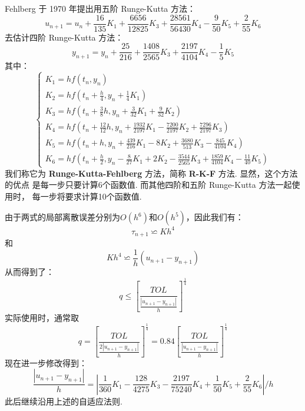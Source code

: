 \documentclass[UTF8,ctexart,a4paper,11pt,openany]{article}
\theoremstyle{definition}
\begin{document}
    Fehlberg 于 1970 年提出用五阶 Runge-Kutta 方法：$$u_{n+1}=u_n+\frac{16}{135}K_1+\frac{6656}{12825}K_3+\frac{28561}{56430}K_4-\frac{9}{50}K_5+\frac{2}{55}K_6$$去估计四阶 Runge-Kutta 方法：$$y_{n+1}=y_n+\frac{25}{216}+\frac{1408}{2565}K_3+\frac{2197}{4104}K_4-\frac{1}{5}K_5$$其中：$$    \left\{\begin{array}{l}
        K_{1}=hf\left(t_{n}, y_{n}\right) \\ 
        K_{2}=hf\left(t_{n}+\frac{h}{4}, y_{n}+\frac{1}{4}K_1\right) \\ 
        K_{3}=hf\left(t_{n}+\frac{3}{8}h, y_{n}+\frac{3}{32}K_1+\frac{9}{32}K_2\right) \\ 
        K_{4}=hf\left(t_{n}+\frac{12}{12}h, y_{n}+\frac{1932}{2197}K_1-\frac{7200}{2197}K_2+\frac{7296}{2197}K_3\right) \\ 
        K_{5}=hf\left(t_{n}+h, y_{n}+\frac{439}{216}K_1-8K_2+\frac{3680}{513}K_3-\frac{845}{4104}K_4\right) \\ 
        K_{6}=hf\left(t_{n}+\frac{h}{2}, y_{n}-\frac{8}{27}K_1+2K_2-\frac{3544}{2565}K_3+\frac{1859}{4104}K_4-\frac{11}{40}K_5\right)  
    \end{array}
    \right.$$我们称它为 \textbf{Runge-Kutta-Fehlberg} 方法，简称 \textbf{R-K-F} 方法. 显然，这个方法的优点
    是每一步只要计算6个函数值. 而其他四阶和五阶 Runge-Kutta 方法一起使用时， 
    每一步将要求计算10个函数值. \par
    由于两式的局部离散误差分别为$O(h^6)$和$O(h^5)$，因此我们有：$$\tau _{n+1}\backsimeq Kh^4$$和$$Kh^4\backsimeq\frac{1}{h}(u_{n+1}-y_{n+1})$$从而得到了：$$q\leqslant \left[\frac{TOL}{\frac{|u_{n+1}-y_{n+1}|}{h}}\right]^{\frac{1}{4}}$$实际使用时，通常取$$q=\left[\frac{TOL}{\frac{2|u_{n+1}-y_{n+1}|}{h}}\right]^{\frac{1}{4}}=0.84\left[\frac{TOL}{\frac{|u_{n+1}-y_{n+1}|}{h}}\right]^{\frac{1}{4}}$$现在进一步修改得到：$$\frac{|u_{n+1}-y_{n+1}|}{h}=\left|\frac{1}{360}K_1-\frac{128}{4275}K_3-\frac{2197}{75240}K_4+\frac{1}{50}K_5+\frac{2}{55}K_6\right|/h$$\indent 此后继续沿用上述的自适应法则. 
\end{document}
